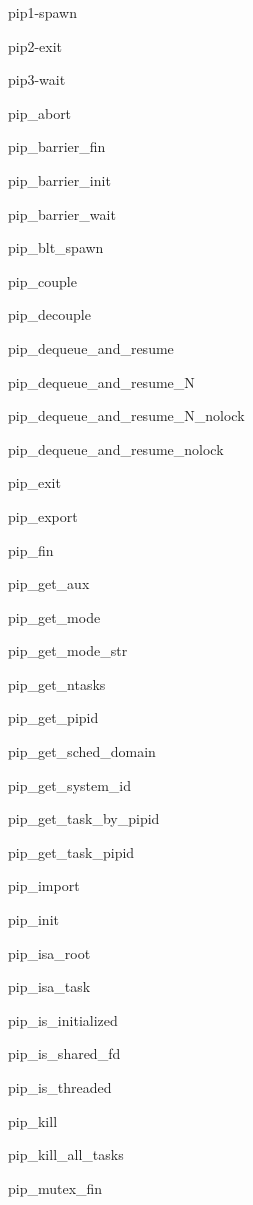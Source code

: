 \begin{DoxyItemize}
\item pip1-\/spawn
\item pip2-\/exit
\item pip3-\/wait
\item pip\-\_\-abort
\item pip\-\_\-barrier\-\_\-fin
\item pip\-\_\-barrier\-\_\-init
\item pip\-\_\-barrier\-\_\-wait
\item pip\-\_\-blt\-\_\-spawn
\item pip\-\_\-couple
\item pip\-\_\-decouple
\item pip\-\_\-dequeue\-\_\-and\-\_\-resume
\item pip\-\_\-dequeue\-\_\-and\-\_\-resume\-\_\-\-N
\item pip\-\_\-dequeue\-\_\-and\-\_\-resume\-\_\-\-N\-\_\-nolock
\item pip\-\_\-dequeue\-\_\-and\-\_\-resume\-\_\-nolock
\item pip\-\_\-exit
\item pip\-\_\-export
\item pip\-\_\-fin
\item pip\-\_\-get\-\_\-aux
\item pip\-\_\-get\-\_\-mode
\item pip\-\_\-get\-\_\-mode\-\_\-str
\item pip\-\_\-get\-\_\-ntasks
\item pip\-\_\-get\-\_\-pipid
\item pip\-\_\-get\-\_\-sched\-\_\-domain
\item pip\-\_\-get\-\_\-system\-\_\-id
\item pip\-\_\-get\-\_\-task\-\_\-by\-\_\-pipid
\item pip\-\_\-get\-\_\-task\-\_\-pipid
\item pip\-\_\-import
\item pip\-\_\-init
\item pip\-\_\-isa\-\_\-root
\item pip\-\_\-isa\-\_\-task
\item pip\-\_\-is\-\_\-initialized
\item pip\-\_\-is\-\_\-shared\-\_\-fd
\item pip\-\_\-is\-\_\-threaded
\item pip\-\_\-kill
\item pip\-\_\-kill\-\_\-all\-\_\-tasks
\item pip\-\_\-mutex\-\_\-fin

\end{DoxyItemize}

